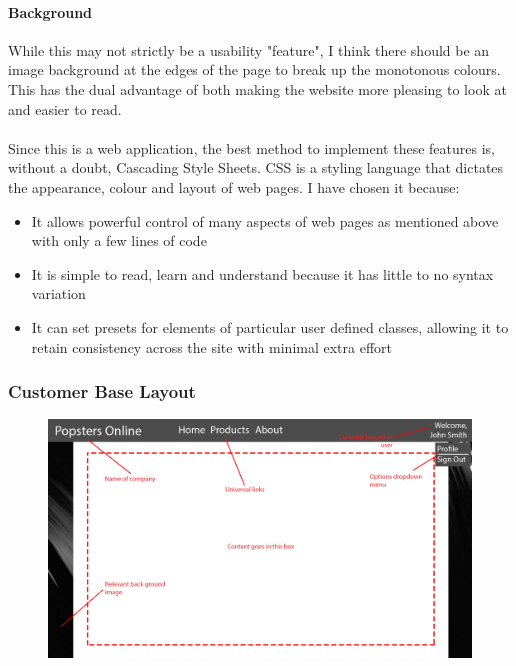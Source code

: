 ﻿\documentclass{article}
\begin{document}
    \paragraph{Background}
    While this may not strictly be a usability "feature", I think there should be an image background at the edges of the page to break up the monotonous colours.
    This has the dual advantage of both making the website more pleasing to look at and easier to read.
    \paragraph{}
    Since this is a web application, the best method to implement these features is, without a doubt, Cascading Style Sheets.
    CSS is a styling language that dictates the appearance, colour and layout of web pages.
    I have chosen it because:
    \begin{itemize}
        \item It allows powerful control of many aspects of web pages as mentioned above with only a few lines of code
        \item It is simple to read, learn and understand because it has little to no syntax variation
        \item It can set presets for elements of particular user defined classes, allowing it to retain consistency across the site with minimal extra effort
    \end{itemize}
    \newpage
    \subsubsection{Customer Base Layout}
    \begin{figure}[H]
        \includegraphics[width=\textwidth]{customerBasic.png}
        \centering
    \end{figure}
\end{document}
